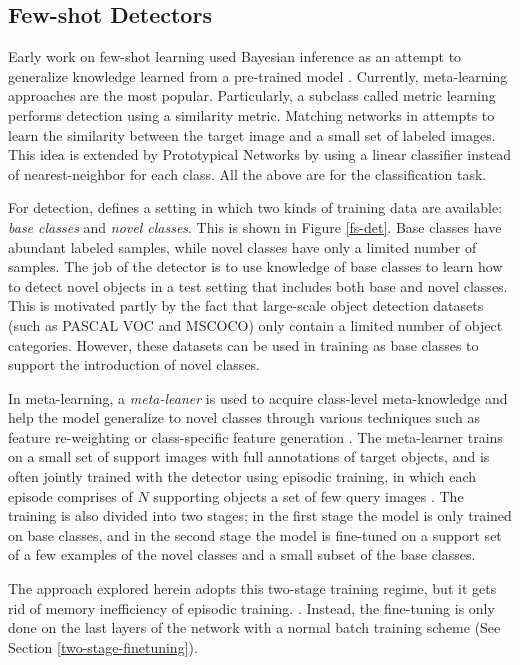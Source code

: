 \documentclass{article}
\begin{document}
\subsection{Few-shot Detectors}
Early work on few-shot learning used Bayesian inference as an attempt to generalize knowledge 
learned from a pre-trained model \cite{fei2006one}. Currently, meta-learning approaches are the most popular.
Particularly, a subclass called metric learning performs detection using a similarity metric. 
Matching networks in \cite{VinyalsBLKW16} attempts to learn the similarity between the target image and 
a small set of labeled images. This idea is extended by Prototypical Networks \cite{snell2017prototypical} 
by using a linear classifier instead of nearest-neighbor for each class. 
All the above are for the classification task. 

For detection, \cite{kang2019few} defines a setting in which two kinds of training data are available: 
\textit{base classes} and \textit{novel classes}. This is shown in Figure \ref{fs-det}. 
Base classes have abundant labeled samples, while 
novel classes have only a limited number of samples. The job of the detector is to use knowledge 
of base classes to  learn how to detect novel objects in a test setting that includes both base and novel classes. 
This is motivated partly by the fact that large-scale object detection datasets (such as 
PASCAL VOC and MSCOCO) only contain a limited number of object categories. However, these datasets can be 
used in training as base classes to support the introduction of novel classes. 

In meta-learning, a \textit{meta-leaner} is used to acquire class-level meta-knowledge and help the model 
generalize to novel classes through various techniques such as feature re-weighting \cite{kang2019few}
or class-specific feature generation \cite{wang2019meta}. The meta-learner trains on a small set of support 
images with full annotations of target objects, and is often jointly trained with the detector using episodic
training, in which each episode comprises of $N$ supporting objects a set of few query images \cite{VinyalsBLKW16}. 
The training is also divided into two stages; in the first stage the model is only trained on 
base classes, and in the second stage the model is fine-tuned on a support set of a few examples 
of the novel classes  and a small subset of the base classes. 

The approach explored herein adopts this two-stage training regime, but it gets rid of memory inefficiency 
of episodic training. \cite{wang2020frustratingly}. Instead, the fine-tuning is only done 
on the last layers of the network with a normal batch training scheme (See Section \ref{two-stage-finetuning}). 
\end{document}
